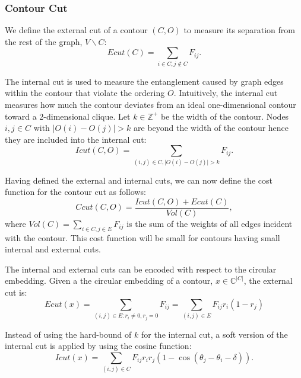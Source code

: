\documentclass{SMBV12}
\begin{document}
\subsubsection{Contour Cut}
We define the external cut of a contour $(C, O)$ to measure its separation from the rest of the graph, $V \backslash C$:
\begin{equation}
Ecut(C) = \sum\limits_{i \in C, j \notin C} F_{ij}.
\end{equation}

The internal cut is used to measure the entanglement caused by graph edges within the contour that violate the
ordering $O$. Intuitively, the internal cut measures how much the contour deviates from an ideal one-dimensional contour toward a 2-dimensional clique. Let $k \in \mathbb{Z}^+$ be the width of the contour. Nodes $i, j \in C$ with $\lvert O(i) - O(j) \rvert > k$ are beyond the width of the contour hence they are included into the internal cut:
\begin{equation}
Icut(C, O) = \sum\limits_{(i, j) \in C, \lvert O(i) - O(j) \rvert > k} F_{ij}.
\end{equation}

Having defined the external and internal cuts, we can now define the cost function for the contour cut as follows:
\begin{equation}
Ccut(C, O) = \dfrac{Icut(C, O) + Ecut(C)}{Vol(C)},
\end{equation}
where $Vol(C) = \sum_{i \in C, j \in E} F_{ij}$ is the sum of the weights of all edges incident with the contour. This cost function will be small for contours having small internal and external cuts.

The internal and external cuts can be encoded with respect to the circular embedding. Given a the circular embedding of a contour, $x \in \mathbb{C}^{\lvert C \rvert}$, the external cut is:
\begin{equation}
Ecut(x) = \sum\limits_{(i, j) \in E: r_i \neq 0, r_j = 0} F_{ij} = \sum\limits_{(i, j) \in E} F_{ij}r_i(1 - r_j)
\end{equation}

Instead of using the hard-bound of $k$ for the internal cut, a soft version of the internal cut is applied by using the cosine function:
\begin{equation}
Icut(x) = \sum\limits_{(i, j) \in C}F_{ij} r_ir_j(1 - \cos(\theta_j - \theta_i - \delta)).
\end{equation}
\end{document}
